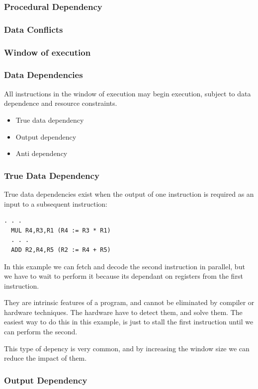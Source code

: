 \subsubsection{Procedural Dependency}
\subsubsection{Data Conflicts}
\subsubsection{Window of execution}
\subsubsection{Data Dependencies}
All instructions in the window of execution may begin execution, subject to data dependence and resource constraints.
\begin{itemize}
\item True data dependency
\item Output dependency
\item Anti dependency
\end{itemize}

\subsubsection{True Data Dependency}
True data dependencies exist when the output of one instruction is required as an input to a subsequent instruction:
\begin{lstlisting}[frame=single]  % Start your code-block
  . . .
  MUL R4,R3,R1 (R4 := R3 * R1)
  . . .
  ADD R2,R4,R5 (R2 := R4 + R5)
\end{lstlisting}
In this example we can fetch and decode the second instruction in parallel, but we have to wait to perform it because its dependant on registers from the first instruction.

They are intrinsic features of a program, and cannot be eliminated by compiler or hardware techniques. The hardware have to detect them, and solve them. The easiest way to do this in this example, is just to stall the first instruction until we can perform the second.

This type of depency is very common, and by increasing the window size we can reduce the impact of them.
\subsubsection{Output Dependency}
